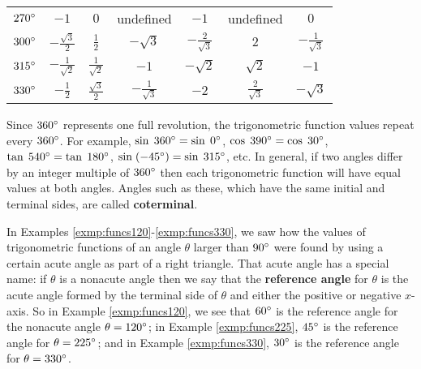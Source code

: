 \begin{table}[h]
\begin{tabular}{rcccccc}
$270^\circ$ & $-1$ & $0$ & undefined & $-1$ & undefined & $0$\\[4pt]
\rowcolor[HTML]{E6E6F2}
$300^\circ$ & $-\frac{\sqrt{3}}{2}$ & $\frac{1}{2}$ & $-\sqrt{3}$ &
 $-\frac{2}{\sqrt{3}}$ & $2$ & $-\frac{1}{\sqrt{3}}$\\[4pt]
$315^\circ$ & $-\frac{1}{\sqrt{2}}$ & $\frac{1}{\sqrt{2}}$ & $-1$ &
 $-\sqrt{2}$ & $\sqrt{2}$ & $-1$\\[4pt]
\rowcolor[HTML]{E6E6F2}
$330^\circ$ & $-\frac{1}{2}$ & $\frac{\sqrt{3}}{2}$ & $-\frac{1}{\sqrt{3}}$ &
 $-2$ & $\frac{2}{\sqrt{3}}$ & $-\sqrt{3}$\\[4pt]
\end{tabular}\label{tbl:commonangles}
\end{table}\vspace{1mm}

Since $360^\circ$ represents one full revolution, the trigonometric function values repeat every
$360^\circ$. For example, $\sin\;360^\circ = \sin\;0^\circ$, $\cos\;390^\circ =
\cos\;30^\circ$, $\tan\;540^\circ = \tan\;180^\circ$, $\sin\;(-45^\circ) =
\sin\;315^\circ$, etc. In general, if two angles differ by an integer multiple of $360^\circ$
then each trigonometric function will have equal values at both angles.
Angles such as these, which have the same initial and terminal sides, are called
\textbf{coterminal}.

In Examples \ref{exmp:funcs120}-\ref{exmp:funcs330}, we saw how the values of trigonometric
functions of an angle
$\theta$ larger than $90^\circ$ were found by using a certain acute angle as part of a right
triangle. That acute angle has a special name: if $\theta$ is a nonacute angle then we say that the
\textbf{reference angle} for $\theta$ is the acute
angle formed by the terminal side of $\theta$ and either the positive or negative $x$-axis. So in
Example \ref{exmp:funcs120}, we see that $60^\circ$ is the reference angle for the nonacute angle
$\theta = 120^\circ$; in Example \ref{exmp:funcs225}, $45^\circ$ is the reference angle for
$\theta = 225^\circ$; and in Example \ref{exmp:funcs330}, $30^\circ$ is the reference angle
for $\theta = 330^\circ$.

